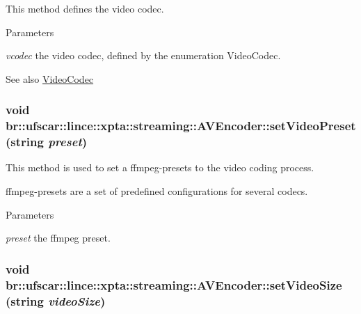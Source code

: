 This method defines the video codec. 


\begin{DoxyParams}{Parameters}
\item[{\em vcodec}]the video codec, defined by the enumeration VideoCodec. \end{DoxyParams}
\begin{DoxySeeAlso}{See also}
\hyperlink{namespacebr_1_1ufscar_1_1lince_1_1xpta_1_1streaming_a0bc6a141499db1ee70a729b694d2dace}{VideoCodec} 
\end{DoxySeeAlso}
\hypertarget{classbr_1_1ufscar_1_1lince_1_1xpta_1_1streaming_1_1AVEncoder_aa9e6c923f02cfcdd8bc8c179bb87bcdb}{
\subsubsection[{setVideoPreset}]{\setlength{\rightskip}{0pt plus 5cm}void br::ufscar::lince::xpta::streaming::AVEncoder::setVideoPreset (string {\em preset})}}
\label{classbr_1_1ufscar_1_1lince_1_1xpta_1_1streaming_1_1AVEncoder_aa9e6c923f02cfcdd8bc8c179bb87bcdb}


This method is used to set a ffmpeg-\/presets to the video coding process. 

ffmpeg-\/presets are a set of predefined configurations for several codecs. 
\begin{DoxyParams}{Parameters}
\item[{\em preset}]the ffmpeg preset. \end{DoxyParams}
\hypertarget{classbr_1_1ufscar_1_1lince_1_1xpta_1_1streaming_1_1AVEncoder_a23325a577dc2b2fd5ae96d60a5f50beb}{
\subsubsection[{setVideoSize}]{\setlength{\rightskip}{0pt plus 5cm}void br::ufscar::lince::xpta::streaming::AVEncoder::setVideoSize (string {\em videoSize})}}
\label{classbr_1_1ufscar_1_1lince_1_1xpta_1_1streaming_1_1AVEncoder_a23325a577dc2b2fd5ae96d60a5f50beb}


